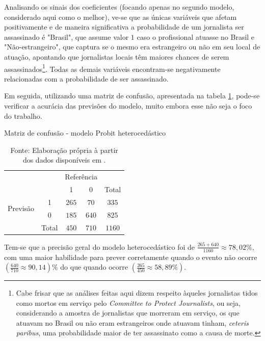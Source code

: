 \documentclass[12pt,
               openright,
               oneside,
               a4paper,
							 section=TITLE,     %
               subsection=Title,  %
               english,brazil]{article}
\begin{document}
Analisando os sinais dos coeficientes (focando apenas no segundo modelo, considerado aqui como o melhor), ve-se que as únicas variáveis que afetam positivamente e de maneira significativa a probabilidade de um jornalista ser assassinado é "Brasil", que assume valor $1$ caso o profissional atuasse no Brasil e "Não-estrangeiro", que captura se o mesmo era estrangeiro ou não em seu local de atuação, apontando que jornalistas locais têm maiores chances de serem assassinados\footnote[8]{Cabe frisar que as análises feitas aqui dizem respeito àqueles jornalistas tidos como mortos em serviço pelo \textit{Committee to Protect Journalists}, ou seja, considerando a amostra de jornalistas que morreram em serviço, os que atuavam no Brasil ou não eram estrangeiros onde atuavam tinham, \textit{ceteris paribus}, uma probabilidade maior de ter assassinato como a causa de morte.}. Todas as demais variáveis encontram-se negativamente relacionadas com a probabilidade de ser assassinado.

Em seguida, utilizando uma matriz de confusão, apresentada na tabela \ref{tab:confusão}, pode-se verificar a acurácia das previsões do modelo, muito embora esse não seja o foco do trabalho.

\begin{table}[H] \centering
\caption{Matriz de confusão - modelo Probit heterocedástico}
\label{tab:confusão}
\begin{tabular}{c|c|c|c|c}
\multicolumn{2}{c}{}&\multicolumn{2}{c}{Referência}&\\
\cline{3-4}
\multicolumn{2}{c|}{}&1&0&\multicolumn{1}{c}{Total}\\
\cline{2-4}
\multirow{2}{*}{Previsão}& 1 & $265$ & $70$ & $335$\\
\cline{2-4}
& 0 & $185$ & $640$ & $825$\\
\cline{2-4}
\multicolumn{1}{c}{} & \multicolumn{1}{c}{Total} & \multicolumn{1}{c}{$450$} & \multicolumn{1}{c}{$710$} & \multicolumn{1}{c}{$1160$}\\
\end{tabular}
\caption*{Fonte: Elaboração própria à partir dos dados disponíveis em \cite{CPJ2020}.}
\end{table}

Tem-se que a precisão geral do modelo heterocedástico foi de $\frac{265+640}{1160} \approx 78,02\%$, com uma maior habilidade para prever corretamente quando o evento não ocorre $\left(\frac{640}{710} \approx 90,14 \right)\%$ do que quando ocorre $\left( \frac{265}{450} \approx 58,89\% \right)$.
\end{document}

